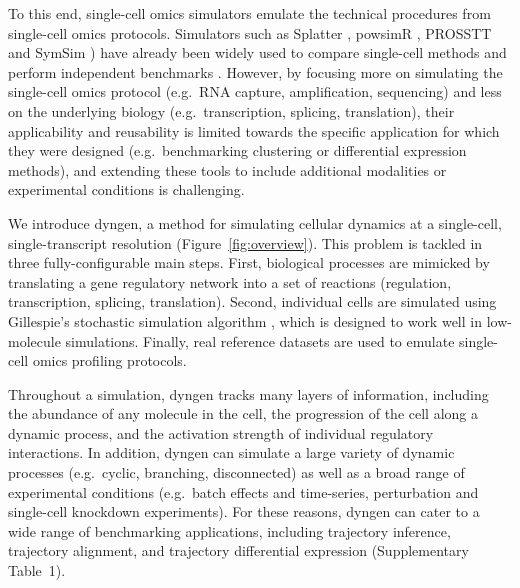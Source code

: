 \documentclass[10pt, a4paper]{article}
\begin{document}
To this end, single-cell omics simulators emulate the technical
procedures from single-cell omics protocols. Simulators such as Splatter
\cite{zappia_splattersimulationsinglecell_2017}, powsimR
\cite{vieth_powsimrpoweranalysis_2017}, PROSSTT
\cite{papadopoulos_prossttprobabilisticsimulation_2019} and SymSim
\cite{zhang_simulatingmultiplefaceted_2019}) have already been
widely used to compare single-cell methods
\cite{street_slingshotcelllineage_2018,parra_reconstructingcomplexlineage_2019,lummertzdarocha_reconstructioncomplexsinglecell_2018,lin_scclassifysamplesize_2020}
and perform independent benchmarks
\cite{duo_systematicperformanceevaluation_2018,saelens_comparisonsinglecelltrajectory_2019,soneson_biasrobustnessscalability_2018}.
However, by focusing more on simulating the single-cell omics protocol
(e.g.~RNA capture, amplification, sequencing) and less on the underlying
biology (e.g.~transcription, splicing, translation), their applicability
and reusability is limited towards the specific application for which
they were designed (e.g.~benchmarking clustering or differential
expression methods), and extending these tools to include additional
modalities or experimental conditions is challenging.

We introduce dyngen, a method for simulating cellular dynamics at a
single-cell, single-transcript resolution (Figure~\ref{fig:overview}).
This problem is tackled in three fully-configurable main steps. First,
biological processes are mimicked by translating a gene regulatory
network into a set of reactions (regulation, transcription, splicing,
translation). Second, individual cells are simulated using Gillespie's
stochastic simulation algorithm
\cite{gillespie_exactstochasticsimulation_1977}, which is designed
to work well in low-molecule simulations. Finally, real reference
datasets are used to emulate single-cell omics profiling protocols.

Throughout a simulation, dyngen tracks many layers of information,
including the abundance of any molecule in the cell, the progression of
the cell along a dynamic process, and the activation strength of
individual regulatory interactions. In addition, dyngen can simulate a
large variety of dynamic processes (e.g.~cyclic, branching,
disconnected) as well as a broad range of experimental conditions
(e.g.~batch effects and time-series, perturbation and single-cell
knockdown experiments). For these reasons, dyngen can cater to a wide
range of benchmarking applications, including trajectory inference,
trajectory alignment, and trajectory differential expression
(Supplementary Table~1).
\end{document}
